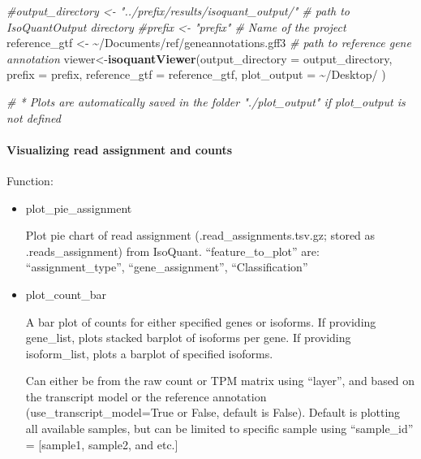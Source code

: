 \documentclass[
]{article}
\newenvironment{Shaded}{\begin{snugshade}}{\end{snugshade}}
\newcommand{\AttributeTok}[1]{\textcolor[rgb]{0.13,0.29,0.53}{#1}}
\newcommand{\CommentTok}[1]{\textcolor[rgb]{0.56,0.35,0.01}{\textit{#1}}}
\newcommand{\FunctionTok}[1]{\textcolor[rgb]{0.13,0.29,0.53}{\textbf{#1}}}
\newcommand{\NormalTok}[1]{#1}
\newcommand{\OtherTok}[1]{\textcolor[rgb]{0.56,0.35,0.01}{#1}}
\newcommand{\StringTok}[1]{\textcolor[rgb]{0.31,0.60,0.02}{#1}}
\begin{document}
\begin{Shaded}
\begin{Highlighting}[]
\CommentTok{\#output\_directory \textless{}{-} "../prefix/results/isoquant\_output/" \# path to IsoQuantOutput directory}
\CommentTok{\#prefix \textless{}{-} "prefix" \# Name of the project}
\NormalTok{reference\_gtf }\OtherTok{\textless{}{-}} \StringTok{\textquotesingle{}\textasciitilde{}/Documents/ref/geneannotations.gff3\textquotesingle{}} \CommentTok{\# path to reference gene annotation }
\NormalTok{viewer}\OtherTok{\textless{}{-}}\FunctionTok{isoquantViewer}\NormalTok{(}\AttributeTok{output\_directory =}\NormalTok{ output\_directory,        }
    \AttributeTok{prefix =}\NormalTok{ prefix, }
    \AttributeTok{reference\_gtf =}\NormalTok{ reference\_gtf,}
    \AttributeTok{plot\_output =} \StringTok{\textquotesingle{}\textasciitilde{}/Desktop/\textquotesingle{}}
\NormalTok{      )}

\CommentTok{\# * Plots are automatically saved in the folder "./plot\_output" if plot\_output is not defined}
\end{Highlighting}
\end{Shaded}

\paragraph{Visualizing read assignment and
counts}\label{visualizing-read-assignment-and-counts}

Function:

\begin{itemize}
\item
  plot\_pie\_assignment

  Plot pie chart of read assignment (.read\_assignments.tsv.gz; stored
  as .reads\_assignment) from IsoQuant. ``feature\_to\_plot'' are:
  ``assignment\_type'', ``gene\_assignment'', ``Classification''
\item
  plot\_count\_bar

  A bar plot of counts for either specified genes or isoforms. If
  providing gene\_list, plots stacked barplot of isoforms per gene. If
  providing isoform\_list, plots a barplot of specified isoforms.

  Can either be from the raw count or TPM matrix using ``layer'', and
  based on the transcript model or the reference annotation
  (use\_transcript\_model=True or False, default is False). Default is
  plotting all available samples, but can be limited to specific sample
  using ``sample\_id'' = {[}sample1, sample2, and etc.{]}
\end{itemize}
\end{document}
